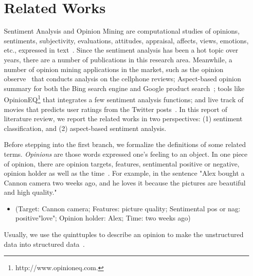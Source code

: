 \documentclass[12pt]{article}
\begin{document}
\section{Related Works}
Sentiment Analysis and Opinion Mining are computational studies of opinions, sentiments, subjectivity, evaluations, attitudes, appraisal, affects, views, emotions, etc., expressed in text~\cite{pang2008opinion}. Since the sentiment analysis has been a hot topic over years, there are a number of publications in this research area. Meanwhile, a number of opinion mining applications in the market, such as the opinion observe~\cite{liu2005opinion} that conducts analysis on the cellphone reviews; Aspect-based opinion summary for both the Bing search engine and Google product search~\cite{blair2008building}; tools like OpinionEQ\footnote{http://www.opinioneq.com.} that integrates a few sentiment analysis functions; and live track of movies that predicts user ratings from the Twitter posts~\cite{thet2010aspect}.  In this report of literature review, we report the related works in two perspectives: (1) sentiment classification, and (2) aspect-based sentiment analysis.

Before stepping into the first branch, we formalize the definitions of some related terms. \emph{Opinions} are those words expressed one's feeling to an object. In one piece of opinion, there are opinion targets, features, sentimental positive or negative, opinion holder as well as the time~\cite{dale2000handbook}. For example, in the sentence "Alex bought a Cannon camera two weeks ago, and he loves it because the pictures are beautiful and high quality." 
\begin{itemize}
\item (Target: Cannon camera; Features: picture quality; Sentimental pos or nag: positive"love"; Opinion holder: Alex; Time: two weeks ago)
\end{itemize}
Usually, we use the quinttuples to describe an opinion to make the unstructured data into structured data~\cite{liu2007web}. 
\end{document}
